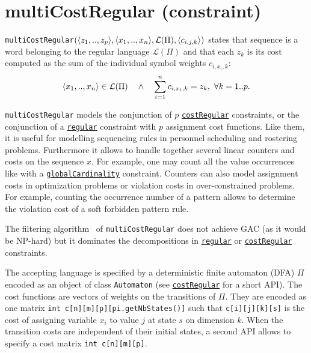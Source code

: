 \label{multicostregular}
\hypertarget{multicostregular}{}

\section{multiCostRegular (constraint)}\label{multicostregular:multicostregularconstraint}\hypertarget{multicostregular:multicostregularconstraint}{}
\begin{notedef}
  \texttt{multiCostRegular}$(\langle z_1,..,z_p\rangle, \langle x_1,..,x_n\rangle,\mathcal{L}(\Pi), \langle c_{i,j,k}\rangle)$ states that sequence  is a word belonging to the regular language $\mathcal{L}(\Pi)$ and that each $z_k$ is its cost computed as the sum of the individual symbol weights $c_{i,x_i,k}$: 
$$ \langle x_1,..,x_n\rangle \in \mathcal{L}(\Pi)\quad\land\quad \sum_{i=1}^n c_{i,x_i,k} = z_k,\ \forall k=1..p.$$ 
\end{notedef}
\texttt{multiCostRegular} models the conjunction of $p$ \hyperlink{costregular}{\texttt{costRegular}} constraints, or the conjunction of a \hyperlink{regular}{\texttt{regular}} constraint with $p$ assignment cost functions. Like them, it is useful for modelling sequencing rules in personnel scheduling and rostering problems. Furthermore it allows to handle together several linear counters and costs on the sequence $x$. For example, one may count all the value occurrences like with a \hyperlink{globalcardinality}{\texttt{globalCardinality}} constraint. Counters can also model assignment costs in optimization problems or violation costs in over-constrained problems. For example, counting the occurrence number of a pattern allows to determine the violation cost of a soft forbidden pattern rule.

The filtering algorithm~\cite{MenanaCPAIOR09} of \texttt{multiCostRegular} does not achieve GAC (as it would be NP-hard) but it dominates the decompositions in \hyperlink{regular}{\texttt{regular}} or \hyperlink{costregular}{\texttt{costRegular}} constraints. 

The accepting language is specified by a deterministic finite automaton (DFA) $\Pi$ encoded as an object of class \texttt{Automaton} (see \hyperlink{costregular}{\texttt{costRegular}} for a short API).
The cost functions are vectors of weights on the transitions of $\Pi$. They are encoded as one matrix \texttt{int c[n][m][p][pi.getNbStates()]} such that
\texttt{c[i][j][k][s]} is the cost of assigning variable $x_i$ to value $j$ at state $s$ on dimension $k$. When the transition costs are independent of their initial states, a second API allows to specify a cost matrix \texttt{int c[n][m][p]}.

